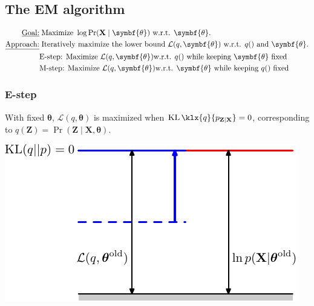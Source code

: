\documentclass[11pt]{article}
\DeclareMathOperator{\KLsym}{KL}
\newcommand{\KL}{\KLsym\klx}
\begin{document}
\subsection{The EM algorithm}
\begin{align*}
  \text{\underline{Goal:}} & \; \text{Maximize } \log \Pr(\mathbf{X} \mid \symbf{\theta})
    \text{ w.r.t. } \symbf{\theta}.  \\
  \text{\underline{Approach:}} & \; \text{Iteratively maximize the lower bound }
    \mathcal{L}(q, \symbf{\theta}) \text { w.r.t. } q() \text{ and }
    \symbf{\theta}. \\
  &\text{E-step: Maximize } \mathcal{L}(q, \symbf{\theta})
    \text{w.r.t. $q()$ while keeping $\symbf{\theta}$ fixed} \\
  &\text{M-step: Maximize } \mathcal{L}(q, \symbf{\theta})
    \text{w.r.t. $\symbf{\theta}$ while keeping $q()$ fixed}
\end{align*}

\subsubsection*{E-step}
With fixed $\symbf{\theta}$, $\mathcal{L}(q, \symbf{\theta})$ is maximized when
$\KL{q}{p_{\mathbf{Z}\mid\mathbf{X}}} = 0$, corresponding to $q(\mathbf{Z}) =
\Pr(\mathbf{Z} \mid \mathbf{X},\symbf{\theta})$.

\begin{center}
  \includegraphics[scale=1]{Figure9-12.pdf}
\end{center}
\end{document}
